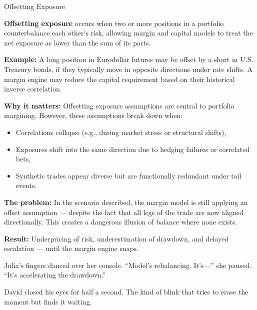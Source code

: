 \medskip

\begin{TechnicalSidebar}{Offsetting Exposure}

  \textbf{Offsetting exposure} occurs when two or more positions in a portfolio counterbalance each other’s risk, allowing margin and capital models to treat the net exposure as lower than the sum of its parts.
  
  \medskip
  
  \textbf{Example:}  
  A long position in Eurodollar futures may be offset by a short in U.S. Treasury bonds, if they typically move in opposite directions under rate shifts. A margin engine may reduce the capital requirement based on their historical inverse correlation.
  
  \medskip
  
  \textbf{Why it matters:}  
  Offsetting exposure assumptions are central to portfolio margining. However, these assumptions break down when:

  \medskip

  \begin{itemize}
    \item Correlations collapse (e.g., during market stress or structural shifts),
    \item Exposures shift into the same direction due to hedging failures or correlated bets,
    \item Synthetic trades appear diverse but are functionally redundant under tail events.
  \end{itemize}
  
  \medskip
  
  \textbf{The problem:}  
  In the scenario described, the margin model is still applying an offset assumption — despite the fact that all legs of the trade are now aligned directionally. This creates a dangerous illusion of balance where none exists.

  \medskip
  
  \textbf{Result:}  
  Underpricing of risk, underestimation of drawdown, and delayed escalation — until the margin engine snaps.
  
\end{TechnicalSidebar}

\medskip

Julia’s fingers danced over her console. “Model’s rebalancing. It’s—” she paused. “It’s accelerating the drawdown.”

David closed his eyes for half a second. The kind of blink that tries to erase the moment but finds it waiting.



